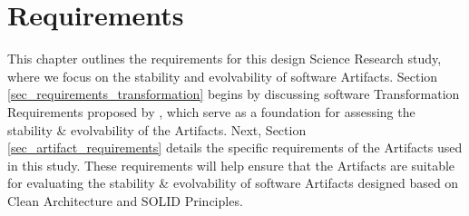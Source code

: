 \chapter{Requirements} \label{chap_requirements} 

This chapter outlines the requirements for this design Science Research study, where we
focus on the stability and evolvability of software Artifacts. Section
\ref{sec_requirements_transformation} begins by discussing software Transformation
Requirements proposed by \textcite{mannaert_normalized_2016}, which serve as a foundation
for assessing the stability \& evolvability of the Artifacts. Next, Section
\ref{sec_artifact_requirements} details the specific requirements of the Artifacts used in
this study. These requirements will help ensure that the Artifacts are suitable for
evaluating the stability \& evolvability of software Artifacts designed based on Clean
Architecture and SOLID Principles.




